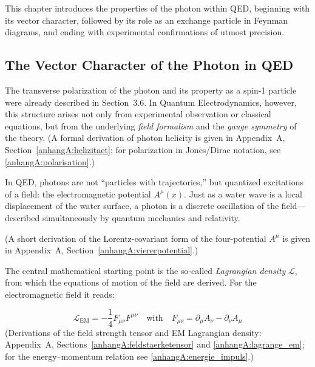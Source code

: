 This chapter introduces the properties of the photon within QED, beginning with its vector character, followed by its role as an exchange particle in Feynman diagrams, and ending with experimental confirmations of utmost precision.

\subsection{The Vector Character of the Photon in QED}

The transverse polarization of the photon and its property as a spin-1 particle were already described in Section~3.6.
In Quantum Electrodynamics, however, this structure arises not only from experimental observation or classical equations, but from the underlying \emph{field formalism} and the \emph{gauge symmetry} of the theory.
(A formal derivation of photon helicity is given in Appendix~A, Section~\ref{anhangA:helizitaet}; for polarization in Jones/Dirac notation, see \ref{anhangA:polarisation}.)

\vspace{1em}
\begin{tcolorbox}[physikbox, title=What is the Field Formalism?]
	\label{box:was ist Feldformalismus}
	\small
	In QED, photons are not “particles with trajectories,” but quantized excitations of a field: the electromagnetic potential \( A^\mu(x) \). Just as a water wave is a local displacement of the water surface, a photon is a discrete oscillation of the field—described simultaneously by quantum mechanics and relativity.
\end{tcolorbox}
\vspace{1em}
(A short derivation of the Lorentz-covariant form of the four-potential \(A^\mu\) is given in Appendix~A, Section~\ref{anhangA:viererpotential}.)

The central mathematical starting point is the so-called \emph{Lagrangian density} \( \mathcal{L} \), from which the equations of motion of the field are derived.
For the electromagnetic field it reads:

\[
\mathcal{L}_{\text{EM}} = -\frac{1}{4} F_{\mu\nu} F^{\mu\nu}
\quad \text{with} \quad F_{\mu\nu} = \partial_\mu A_\nu - \partial_\nu A_\mu
\]
(Derivations of the field strength tensor and EM Lagrangian density: Appendix~A, Sections~\ref{anhangA:feldstaerketensor} and \ref{anhangA:lagrange_em}; for the energy–momentum relation see \ref{anhangA:energie_impuls}.)

